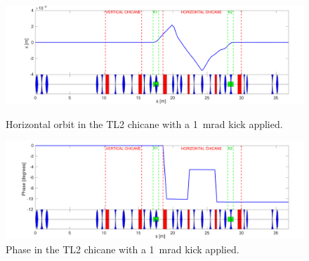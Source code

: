 \begin{landscape}
\begin{figure}
  \centering
  \includegraphics[width=0.85\hsize]{Figures/optics/pffOpticsX}
  \caption{Horizontal orbit in the TL2 chicane with a 1~mrad kick applied.}
  \label{f:pffOpticsX}
  \includegraphics[width=0.85\hsize]{Figures/optics/pffOpticsPhase}
  \caption{Phase in the TL2 chicane with a 1~mrad kick applied.}
  \label{f:pffOpticsPhase}
\end{figure}
\end{landscape}
